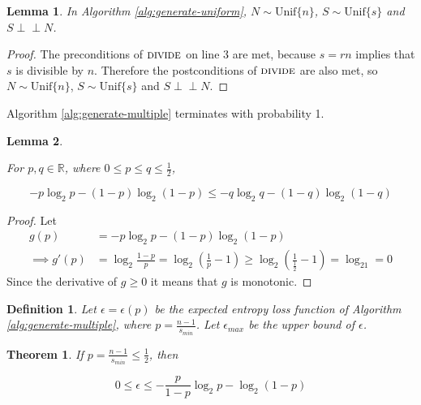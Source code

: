 \documentclass[lettersize,onecolumn]{IEEEtran}
\newtheorem{lemma}{Lemma}
\newtheorem{definition}{Definition}
\newtheorem{theorem}{Theorem}
\newcommand{\indep}{\perp\!\!\!\perp}
\newcommand{\unif}[1]{\mathrm{Unif}\{#1\}}
\begin{document}
\begin{lemma}
    In Algorithm \ref{alg:generate-uniform}, $N \sim \unif{n}$, $S \sim \unif{s}$ and $S \indep N$.
\end{lemma}

\begin{proof}
    The preconditions of $\textsc{divide}$ on line 3 are met, because $s=rn$ implies that $s$ is divisible by $n$. Therefore the postconditions of $\textsc{divide}$ are also met, so $N \sim \unif{n}$, $S \sim \unif{s}$ and $S \indep N$.
\end{proof}

Algorithm \ref{alg:generate-multiple} terminates with probability 1.

\begin{lemma}
    \label{lem:shannon-inequality}

For $p,q \in \mathbb{R}$, where $0 \le p\le q \le \frac{1}{2}$, 

\begin{equation}
-p\log_2 p - (1-p)\log_2(1-p) \le -q\log_2 q - (1-q)\log_2(1-q)
\end{equation}
\end{lemma}

\begin{proof}
    Let
    \begin{align}
        g(p) & = -p\log_2 p - (1-p)\log_2(1-p) \\
        \implies g'(p) & = \log_2\frac{1-p}{p} = \log_2(\frac{1}{p}-1) \ge \log_2(\frac{1}{\frac{1}{2}}-1) = \log_21 = 0 
    \end{align}
Since the derivative of $g\ge 0$ it means that $g$ is monotonic.
\end{proof}

\begin{definition}
    Let $\epsilon = \epsilon(p)$ be the expected entropy loss function of Algorithm \ref{alg:generate-multiple}, where $p=\frac{n-1}{s_{min}}$. Let $\epsilon_{max}$ be the upper bound of $\epsilon$.
\end{definition}

\begin{theorem}
    \label{thm:loss}
If $p = \frac{n-1}{s_{min}} \le \frac{1}{2}$, then

\begin{equation}
0 \le \epsilon \le -\frac{p}{1-p}\log_2p - \log_2(1-p)
\end{equation}

\end{theorem}
\end{document}
